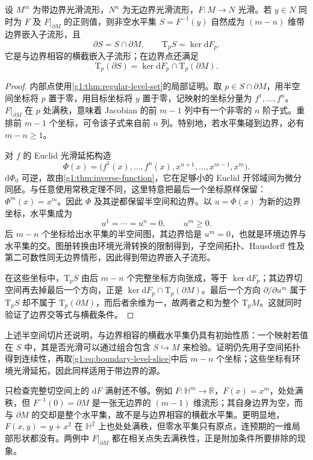 \begin{theorem}\label{g1:thm:boundary-regular-level-set}
	设 \(M^m\) 为带边界光滑流形，\(N^n\) 为无边界光滑流形，\(F:M\to N\) 光滑。若 \(y\in N\) 同时为 \(F\) 及 \(F|_{\partial M}\) 的正则值，则非空水平集 \(S=F^{-1}(y)\) 自然成为 \((m-n)\) 维带边界嵌入子流形，且
	\[
		\partial S=S\cap\partial M,\qquad \mathrm{T}_pS=\ker\mathrm{d}F_p.
	\]
	它是与边界相容的横截嵌入子流形；在边界点还满足
	\[
		\mathrm{T}_p(\partial S)=\ker\mathrm{d}F_p\cap \mathrm{T}_p(\partial M).
	\]
\end{theorem}
\begin{proof}
	内部点使用\cref{g1:thm:regular-level-set}的局部证明。取 \(p\in S\cap\partial M\)，用半空间坐标将 \(p\) 置于零，用目标坐标将 \(y\) 置于零，记映射的坐标分量为 \(f^1,\ldots,f^n\)。\(F|_{\partial M}\) 在 \(p\) 处满秩，意味着 Jacobian 的前 \(m-1\) 列中有一个非零的 \(n\) 阶子式。重排前 \(m-1\) 个坐标，可令该子式来自前 \(n\) 列。特别地，若水平集碰到边界，必有 \(m-n\ge1\)。

	对 \(f\) 的 Euclid 光滑延拓构造
	\[
		\Phi(x)=\bigl(f^1(x),\ldots,f^n(x),x^{n+1},\ldots,x^{m-1},x^m\bigr).
	\]
	\(\mathrm{d}\Phi_0\) 可逆，故由\cref{g1:thm:inverse-function}，它在足够小的 Euclid 开邻域间为微分同胚。与任意使用常秩定理不同，这里特意把最后一个坐标原样保留：\(\Phi^m(x)=x^m\)。因此 \(\Phi\) 及其逆都保留半空间和边界。以 \(u=\Phi(x)\) 为新的边界坐标，水平集成为
	\begin{equation}\label{g1:eq:boundary-level-slice}
		u^1=\cdots=u^n=0,\qquad u^m\ge0.
	\end{equation}
	后 \(m-n\) 个坐标给出水平集的半空间图，其边界恰是 \(u^m=0\)，也就是环境边界与水平集的交。图册转换由环境光滑转换的限制得到，子空间拓扑、Hausdorff 性及第二可数性同无边界情形，因此得到带边界嵌入子流形。

	在这些坐标中，\(\mathrm{T}_pS\) 由后 \(m-n\) 个完整坐标方向张成，等于 \(\ker\mathrm{d}F_p\)；其边界切空间再去掉最后一个方向，正是 \(\ker\mathrm{d}F_p\cap \mathrm{T}_p(\partial M)\)。最后一个方向 \(\partial/\partial u^m\) 属于 \(\mathrm{T}_pS\) 却不属于 \(\mathrm{T}_p(\partial M)\)，而后者余维为一，故两者之和为整个 \(\mathrm{T}_pM\)。这就同时验证了边界交等式与横截条件。
\end{proof}

上述半空间切片还说明，与边界相容的横截水平集仍具有初始性质：一个映射若值在 \(S\) 中，其是否光滑可以通过组合包含 \(S\hookrightarrow M\) 来检验。证明仍先用子空间拓扑得到连续性，再取\eqref{g1:eq:boundary-level-slice}中后 \(m-n\) 个坐标；这些坐标有环境光滑延拓，因此同样适用于带边界的源。

\ProseParagraphBreak

只检查完整切空间上的 \(\mathrm{d}F\) 满射还不够。例如 \(F:\mathbb H^m\to\mathbb R\)，\(F(x)=x^m\)，处处满秩，但 \(F^{-1}(0)=\partial M\) 是一张无边界的 \((m-1)\) 维流形；其自身边界为空，而与 \(\partial M\) 的交却是整个水平集，故不是与边界相容的横截水平集。更明显地，\(F(x,y)=y+x^2\) 在 \(\mathbb H^2\) 上也处处满秩，但零水平集只有原点，连预期的一维局部形状都没有。两例中 \(F|_{\partial M}\) 都在相关点失去满秩性，正是附加条件所要排除的现象。
